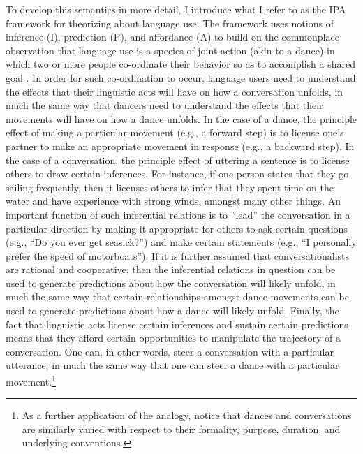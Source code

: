 To develop this semantics in more detail, I introduce what I refer to as the IPA framework for theorizing about language use. The framework uses notions of inference (I), prediction (P), and affordance (A) to build on the commonplace observation that language use is a species of joint action (akin to a dance) in which two or more people co-ordinate their behavior so as to accomplish a shared goal \citep{Clark:1996,Lewis:1975,Brandom:2010}. In order for such co-ordination to occur, language users need to understand the effects that their linguistic acts will have on how a conversation unfolds, in much the same way that dancers need to understand the effects that their movements will have on how a dance unfolds. In the case of a dance, the principle effect of making a particular movement (e.g., a forward step) is to license one's partner to make an appropriate movement in response (e.g., a backward step). In the case of a conversation, the principle effect of uttering a sentence is to license others to draw certain inferences. For instance, if one person states that they go sailing frequently, then it licenses others to infer that they spent time on the water and have experience with strong winds, amongst many other things. An important function of such inferential relations is to ``lead'' the conversation in a particular direction by making it appropriate for others to ask certain questions (e.g., ``Do you ever get seasick?'') and make certain statements (e.g., ``I personally prefer the speed of motorboats''). If it is further assumed that conversationalists are rational and cooperative, then the inferential relations in question can be used to generate predictions about how the conversation will likely unfold, in much the same way that certain relationships amongst dance movements can be used to generate predictions about how a dance will likely unfold. Finally, the fact that linguistic acts license certain inferences and sustain certain predictions means that they afford certain opportunities to manipulate the trajectory of a conversation. One can, in other words, steer a conversation with a particular utterance, in much the same way that one can steer a dance with a particular movement.\footnote{As a further application of the analogy, notice that dances and conversations are similarly varied with respect to their formality, purpose, duration, and underlying conventions.}

